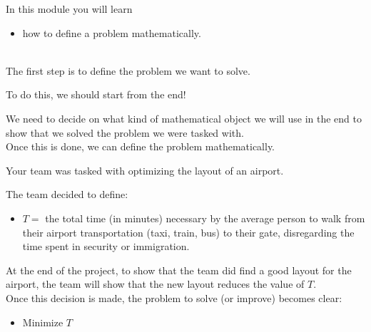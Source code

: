 	In this module you will learn
	\begin{itemize}
		\item how to define a problem mathematically.
	\end{itemize}

\hfill \\


The first step is to define the problem we want to solve.

\begin{important}
	To do this, we should start from the end!
\end{important}

We need to decide on what kind of mathematical object we will use in the end to show that we solved the problem we were tasked with. \\


Once this is done, we can define the problem mathematically. 

\begin{example}
	Your team was tasked with optimizing the layout of an airport. 

	The team decided to define:
	\begin{itemize}
		\item $T = $ the total time (in minutes) necessary by the average person to walk from their airport transportation (taxi, train, bus) to their gate, disregarding the time spent in security or immigration.
	\end{itemize}

	At the end of the project, to show that the team did find a good layout for the airport, the team will show that the new layout reduces the value of $T$. \\

	Once this decision is made, the problem to solve (or improve) becomes clear:
	
	\begin{itemize}
		\item Minimize $T$
	\end{itemize}


\end{example}
